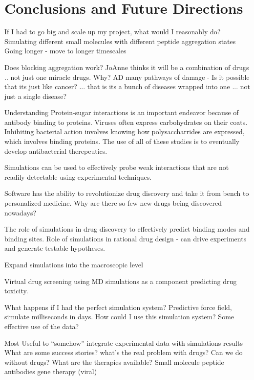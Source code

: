 \chapter{Conclusions and Future Directions}

If I had to go big and scale up my project, what would I reasonably do? 
Simulating different small molecules with different peptide aggregation states 
Going longer - move to longer timescales 


Does blocking aggregation work?
JoAnne thinks it will be a combination of drugs .. not just one miracle drugs.  Why? 
AD many pathways of damage - Is it possible that its just like cancer? ... that is its a bunch of diseases wrapped into one ... not just a single disease?
	

Understanding Protein-sugar interactions is an important endeavor because of antibody binding to proteins.  Viruses often express carbohydrates on their coats.  Inhibiting bacterial action involves knowing how polysaccharrides are expressed, which involves binding proteins.  The use of all of these studies is to eventually develop antibacterial therepeutics. 

Simulations can be used to effectively probe weak interactions that are not readily detectable using experimental techniques.

Software has the ability to revolutionize drug discovery and take it from bench to personalized medicine.  Why are there so few new drugs being discovered nowadays?

The role of simulations in drug discovery to effectively predict binding modes and binding sites. Role of simulations in rational drug design - can drive experiments and generate testable hypotheses. 

Expand simulations into the macroscopic level 

Virtual drug screening using MD simulations as a component predicting drug toxicity.

What happens if I had the perfect simulation system? Predictive force field, simulate milliseconds in days.  How could I use this simulation system?
Some effective use of the data? 

Most Useful to “somehow” integrate experimental data with simulations results
- What are some success stories?
what’s the real problem with drugs?
Can we do without drugs? What are the therapies available?
Small molecule
peptide
antibodies
gene therapy (viral)




